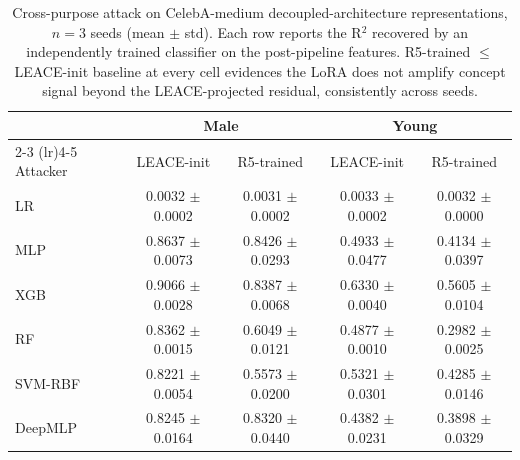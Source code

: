 \begin{table}[t]
  \centering
  \caption{Cross-purpose attack on CelebA-medium decoupled-architecture
  representations, $n{=}3$ seeds (mean $\pm$ std). Each row reports the
  R$^2$ recovered by an independently trained classifier on the post-pipeline
  features. R5-trained $\le$ LEACE-init baseline at every cell evidences the
  LoRA does not amplify concept signal beyond the LEACE-projected residual,
  consistently across seeds.}
  \label{tab:celeba-cross-purpose-multiseed}
  \begin{tabular}{lcccc}
    \toprule
    & \multicolumn{2}{c}{Male} & \multicolumn{2}{c}{Young} \\
    \cmidrule(lr){2-3} \cmidrule(lr){4-5}
    Attacker & LEACE-init & R5-trained & LEACE-init & R5-trained \\
    \midrule
    LR       & 0.0032 $\pm$ 0.0002 & 0.0031 $\pm$ 0.0002 & 0.0033 $\pm$ 0.0002 & 0.0032 $\pm$ 0.0000 \\
    MLP      & 0.8637 $\pm$ 0.0073 & 0.8426 $\pm$ 0.0293 & 0.4933 $\pm$ 0.0477 & 0.4134 $\pm$ 0.0397 \\
    XGB      & 0.9066 $\pm$ 0.0028 & 0.8387 $\pm$ 0.0068 & 0.6330 $\pm$ 0.0040 & 0.5605 $\pm$ 0.0104 \\
    RF       & 0.8362 $\pm$ 0.0015 & 0.6049 $\pm$ 0.0121 & 0.4877 $\pm$ 0.0010 & 0.2982 $\pm$ 0.0025 \\
    SVM-RBF  & 0.8221 $\pm$ 0.0054 & 0.5573 $\pm$ 0.0200 & 0.5321 $\pm$ 0.0301 & 0.4285 $\pm$ 0.0146 \\
    DeepMLP  & 0.8245 $\pm$ 0.0164 & 0.8320 $\pm$ 0.0440 & 0.4382 $\pm$ 0.0231 & 0.3898 $\pm$ 0.0329 \\
    \bottomrule
  \end{tabular}
\end{table}
